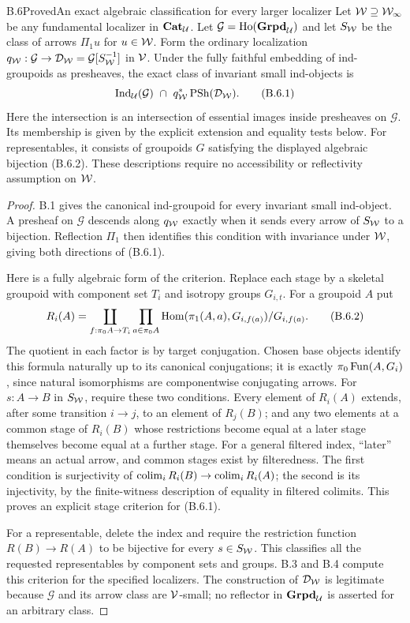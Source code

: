 \begin{claim}{B.6}{Proved}{An exact algebraic classification for every larger localizer}
Let $\mathcal W\supseteq\mathcal W_\infty$ be any fundamental localizer in $\mathbf{Cat}_\mathcal U$. Let $\mathcal G=\operatorname{Ho}(\mathbf{Grpd}_\mathcal U)$ and let $S_{\mathcal W}$ be the class of arrows $\Pi_1u$ for $u\in\mathcal W$. Form the ordinary localization $q_{\mathcal W}:\mathcal G\to\mathcal D_{\mathcal W}=\mathcal G[S_{\mathcal W}^{-1}]$ in $\mathcal V$. Under the fully faithful embedding of ind-groupoids as presheaves, the exact class of invariant small ind-objects is
\[
 \operatorname{Ind}_\mathcal U(\mathcal G)\ \cap\
 q_{\mathcal W}^*\operatorname{PSh}(\mathcal D_{\mathcal W}). \tag{B.6.1}
\]
Here the intersection is an intersection of essential images inside presheaves on $\mathcal G$. Its membership is given by the explicit extension and equality tests below. For representables, it consists of groupoids $G$ satisfying the displayed algebraic bijection (B.6.2). These descriptions require no accessibility or reflectivity assumption on $\mathcal W$.
\end{claim}
\begin{proof}
B.1 gives the canonical ind-groupoid for every invariant small ind-object. A presheaf on $\mathcal G$ descends along $q_{\mathcal W}$ exactly when it sends every arrow of $S_{\mathcal W}$ to a bijection. Reflection $\Pi_1$ then identifies this condition with invariance under $\mathcal W$, giving both directions of (B.6.1).

Here is a fully algebraic form of the criterion. Replace each stage by a skeletal groupoid with component set $T_i$ and isotropy groups $G_{i,t}$. For a groupoid $A$ put
\[
 R_i(A)=\coprod_{f:\pi_0A\to T_i}
          \prod_{a\in\pi_0A}
       \operatorname{Hom}(\pi_1(A,a),G_{i,f(a)})/G_{i,f(a)}. \tag{B.6.2}
\]
The quotient in each factor is by target conjugation. Chosen base objects identify this formula naturally up to its canonical conjugations; it is exactly $\pi_0\operatorname{Fun}(A,G_i)$, since natural isomorphisms are componentwise conjugating arrows. For $s:A\to B$ in $S_{\mathcal W}$, require these two conditions. Every element of $R_i(A)$ extends, after some transition $i\to j$, to an element of $R_j(B)$; and any two elements at a common stage of $R_i(B)$ whose restrictions become equal at a later stage themselves become equal at a further stage. For a general filtered index, ``later'' means an actual arrow, and common stages exist by filteredness. The first condition is surjectivity of $\operatorname{colim}_iR_i(B)\to\operatorname{colim}_iR_i(A)$; the second is its injectivity, by the finite-witness description of equality in filtered colimits. This proves an explicit stage criterion for (B.6.1).

For a representable, delete the index and require the restriction function $R(B)\to R(A)$ to be bijective for every $s\in S_{\mathcal W}$. This classifies all the requested representables by component sets and groups. B.3 and B.4 compute this criterion for the specified localizers. The construction of $\mathcal D_{\mathcal W}$ is legitimate because $\mathcal G$ and its arrow class are $\mathcal V$-small; no reflector in $\mathbf{Grpd}_\mathcal U$ is asserted for an arbitrary class.
\end{proof}

